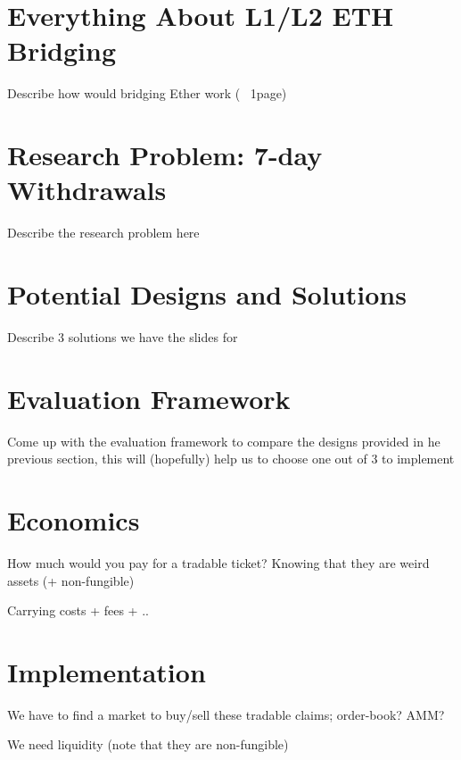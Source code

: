 


\section{Everything About L1/L2 ETH Bridging}
	Describe how would bridging Ether work (~ 1page)


\section{Research Problem: 7-day Withdrawals}
	Describe the research problem here 


\section{Potential Designs and Solutions}
	Describe 3 solutions we have the slides for 

\section{Evaluation Framework}
	Come up with the evaluation framework to compare the designs provided in he previous section, this will (hopefully) help us to choose one out of 3 to implement

\section{Economics}
	How much would you pay for a tradable ticket? Knowing that they are weird assets (+ non-fungible)\par
 Carrying costs + fees + ..


\section{Implementation}

 We have to find a market to buy/sell these tradable claims; order-book? AMM? \par
 We need liquidity (note that they are non-fungible)








